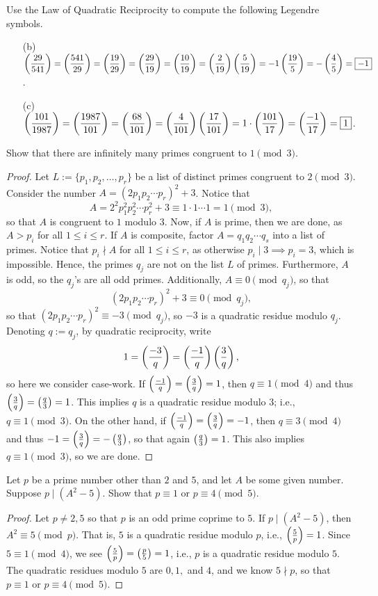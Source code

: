 \documentclass{article}
\newcommand{\leg}[2]{\paren{\frac{#1}{#2}}}
\begin{document}
\begin{exercise}[Chapter 22, \#1b-c]
Use the Law of Quadratic Reciprocity to compute the following Legendre symbols.
\begin{itemize}
    \item[(b)] $\ds\leg{29}{541} = \leg{541}{29} = \leg{19}{29} = \leg{29}{19} = \leg{10}{19} = \leg{2}{19} \leg{5}{19} = -1\leg{19}5 = -\leg 45 = \boxed{-1}$.
    \item[(c)] $\ds\leg{101}{1987} = \leg{1987}{101} = \leg{68}{101} = \leg{4}{101} \leg{17}{101} = 1\cdot \leg{101}{17} = \leg{-1}{17} = \boxed{1}$.
\end{itemize}
\end{exercise}

\begin{exercise}[Chapter 22, \#3]
Show that there are infinitely many primes congruent to $1\pmod 3$.
\end{exercise}
\begin{proof}
Let $L := \{p_1, p_2, \ldots, p_r\}$ be a list of distinct primes congruent to $2\pmod 3$. Consider the number $A = (2p_1p_2\cdots p_r)^2 + 3$. Notice that
$$A = 2^2p_1^2p_2^2\cdots p_r^2 + 3\equiv 1 \cdot 1 \cdots 1  = 1\pmod 3,$$
so that $A$ is congruent to $1$ modulo $3$. Now, if $A$ is prime, then we are done, as $A > p_i$ for all $1\leq i \leq r$. If $A$ is composite, factor $A = q_1q_2\cdots q_s$ into a list of primes. Notice that $p_i\nmid A$ for all $1\leq i \leq r$, as otherwise $p_i\mid 3\implies p_i = 3$, which is impossible. Hence, the primes $q_j$ are not on the list $L$ of primes. Furthermore, $A$ is odd, so the $q_j$'s are all odd primes. Additionally, $A\equiv 0\pmod{q_j}$, so that
$$(2p_1p_2\cdots p_r)^2 + 3\equiv 0\pmod{q_j},$$
so that $(2p_1p_2\cdots p_r)^2 \equiv -3\pmod{q_j}$, so $-3$ is a quadratic residue modulo $q_j$. Denoting $q := q_j$, by quadratic reciprocity, write
$$1 = \leg{-3}q = \leg{-1}q\leg 3q,$$
so here we consider case-work. If $\leg{-1}q = \leg 3q = 1$, then $q\equiv 1\pmod 4$ and thus $\leg 3q = \leg q3 = 1$. This implies $q$ is a quadratic residue modulo $3$; i.e., $q\equiv 1\pmod 3$. On the other hand, if $\leg{-1} q = \leg 3q = -1$, then $q\equiv 3\pmod 4$ and thus $-1=\leg 3q = -\leg q3$, so that again $\leg q3 = 1$. This also implies $q\equiv 1\pmod 3$, so we are done.
\end{proof}

\begin{exercise}[Chapter 22, \#4]
Let $p$ be a prime number other than $2$ and $5$, and let $A$ be some given number. Suppose $p\mid (A^2-5)$. Show that $p\equiv 1$ or $p\equiv 4\pmod 5$.
\end{exercise}
\begin{proof}
Let $p\neq 2, 5$ so that $p$ is an odd prime coprime to $5$. If $p\mid (A^2-5)$, then $A^2\equiv 5\pmod p$. That is, $5$ is a quadratic residue modulo $p$, i.e., $\leg 5p = 1$. Since $5\equiv 1\pmod 4$, we see $\leg 5p = \leg p5 = 1$, i.e., $p$ is a quadratic residue modulo $5$. The quadratic residues modulo $5$ are $0, 1,$ and $4$, and we know $5\nmid p$, so that $p\equiv 1$ or $p\equiv 4\pmod 5$.
\end{proof}
\end{document}
